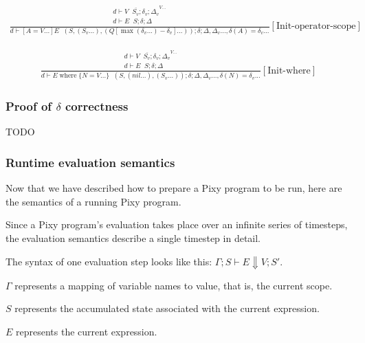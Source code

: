 \documentclass{scrartcl}
\DeclareMathOperator{\where}{where}
\DeclareMathOperator{\initrel}{\overset{init}{\Rightarrow}}
\begin{document}
    \begin{align*}
    \frac{
        \begin{matrix}
        \overline{d \vdash V \initrel S_v; \delta_v; \Delta_v}^{V...} \\
        d \vdash E \initrel S; \delta; \Delta
        \end{matrix}
    }{
        d \vdash [A=V...]E \initrel (S, (S_v...), (Q[\max(\delta_v...) - \delta_v]...)); \delta; \Delta, \Delta_v..., \delta(A)=\delta_v...
    }[\text{Init-operator-scope}]
    \end{align*}
    
    \begin{align*}
    \frac{
        \begin{matrix}
        \overline{d \vdash V \initrel S_v; \delta_v; \Delta_v}^{V...} \\
        d \vdash E \initrel S; \delta; \Delta
        \end{matrix}
    }{
        d \vdash E \where \{ N=V... \} \initrel (S, (nil...), (S_v...)); \delta; \Delta, \Delta_v..., \delta(N)=\delta_v...
    }[\text{Init-where}]
    \end{align*}
    
    \subsubsection{Proof of $\delta$ correctness}
    
    TODO
    
    \subsubsection{Runtime evaluation semantics}
    
    Now that we have described how to prepare a Pixy program to be run, here are the semantics of a running Pixy program.
    
    Since a Pixy program's evaluation takes place over an infinite series of timesteps, the evaluation semantics describe a single timestep in detail.
    
    The syntax of one evaluation step looks like this: $\Gamma; S \vdash E \Downarrow V; S'$.
    
    $\Gamma$ represents a mapping of variable names to value, that is, the current scope.
    
    $S$ represents the accumulated state associated with the current expression.
    
    $E$ represents the current expression.
    
\end{document}

